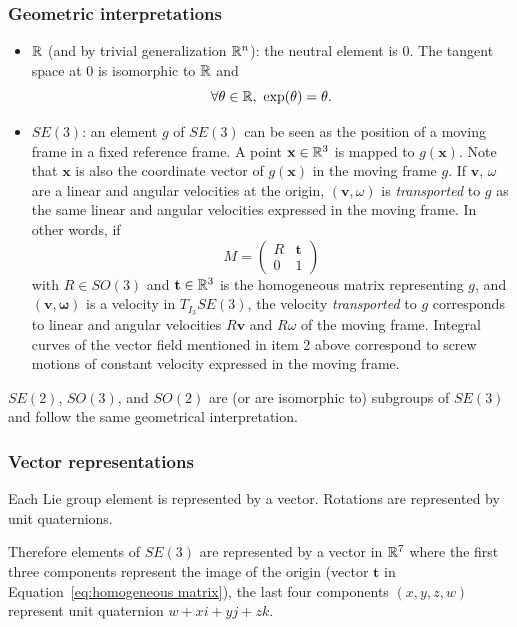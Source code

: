 \subsubsection{Geometric interpretations}
\begin{itemize}
\item $\mathbb{R}$ (and by trivial generalization $\mathbb{R}^n$): the neutral element is $0$. The tangent space at 0 is isomorphic to $\mathbb{R}$ and
  $$
  \forall \theta\in\mathbb{R},\  \exp(\theta) = \theta.
  $$
\item $SE(3)$: an element $g$ of $SE(3)$ can be seen as the position of a moving frame in a fixed reference frame. A point $\mathbf{x}\in\mathbb{R}^3$ is mapped to $g(\mathbf{x})$. Note that $\mathbf{x}$ is also the coordinate vector of $g(\mathbf{x})$ in the moving frame $g$. If $\mathbf{v}$, $\omega$ are a linear and angular velocities at the origin, $(\mathbf{v},\omega)$ is \textit{transported} to $g$
  as the same linear and angular velocities expressed in the moving frame. In other words, if
  \begin{equation}\label{eq:homogeneous matrix}
  M=\left(\begin{array}{ll} R & \mathbf{t}\\ 0 & 1\end{array}\right)
    \end{equation}
  with $R\in SO(3)$ and $\mathbf{t}\in\mathbb{R}^3$  is the homogeneous matrix
  representing $g$, and $(\mathbf{v},\mathbf{\omega})$ is a velocity in $T_{I_3}SE(3)$, the velocity \textit{transported} to $g$ corresponds to linear and angular velocities $R\mathbf{v}$ and $R\omega$ of the moving frame.
  Integral curves of the vector field mentioned in item 2 above correspond to screw motions of constant velocity expressed in the moving frame.
\end{itemize}
$SE(2)$, $SO(3)$, and $SO(2)$ are (or are isomorphic to) subgroups of $SE(3)$ and follow the same geometrical interpretation.

\subsubsection{Vector representations}
Each Lie group element is represented by a vector. Rotations are represented by
unit quaternions.

Therefore elements of $SE(3)$ are represented by a vector in $\mathbb{R}^7$ where the first three components represent the image of the origin (vector $\mathbf{t}$ in Equation~\ref{eq:homogeneous matrix}), the last four components $(x,y,z,w)$ represent unit quaternion $w + x {i} + y {j} + z {k}$.


